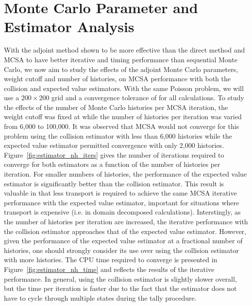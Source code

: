 \section{Monte Carlo Parameter and Estimator Analysis}
\label{sec:parameter_estimator_analysis}
With the adjoint method shown to be more effective than the direct
method and MCSA to have better iterative and timing performance than
sequential Monte Carlo, we now aim to study the effects of the adjoint
Monte Carlo parameters, weight cutoff and number of histories, on MCSA
performance with both the collision and expected value
estimators. With the same Poisson problem, we will use a $200 \times
200$ grid and a convergence tolerance of  for all
calculations. To study the effects of the number of Monte Carlo
histories per MCSA iteration, the weight cutoff was fixed at
 while the number of histories per iteration was varied from
6,000 to 100,000. It was observed that MCSA would not converge for
this problem using the collision estimator with less than 6,000
histories while the expected value estimator permitted convergence
with only 2,000 histories. Figure~\ref{fig:estimator_nh_iters} gives
the number of iterations required to converge for both estimators as a
function of the number of histories per iteration. For smaller numbers
of histories, the performance of the expected value estimator is
significantly better than the collision estimator. This result is
valuable in that less transport is required to achieve the same MCSA
iterative performance with the expected value estimator, important for
situations where transport is expensive (i.e. in domain decomposed
calculations). Interstingly, as the number of histories per iteration
are increased, the iterative performance with the collision estimator
approaches that of the expected value estimator. However, given the
performance of the expected value estimator at a fractional number of
histories, one should strongly consider its use over using the collision
estimator with more histories. The CPU time required to converge is
presented in Figure~\ref{fig:estimator_nh_time} and reflects the
results of the iterative performance. In general, using the collision
estimator is slightly slower overall, but the time per iteration is
faster due to the fact that the estimator does not have to cycle
through multiple states during the tally procedure.

